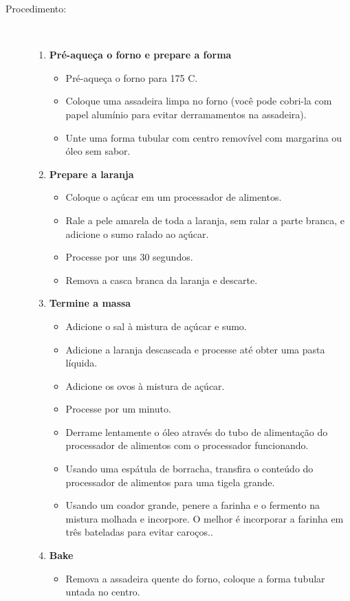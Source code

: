 \documentclass [11pt, letterpaper] {article}
\begin{document}
\begin {description}
\item [Procedimento:] \ \\
\begin {enumerate}
\item {\bf Pré-aqueça o forno e prepare a forma}
\begin {itemize}
\item Pré-aqueça o forno para 175 C.
\item Coloque uma assadeira limpa no forno (você pode cobri-la com papel alumínio para evitar derramamentos na assadeira).
\item Unte uma forma tubular com centro removível com margarina ou
\'oleo sem sabor.
\end {itemize}
\item {\bf Prepare a laranja}
\begin {itemize}
\item Coloque o açúcar em um processador de alimentos.
\item Rale a pele amarela de toda  a laranja, sem ralar a parte
branca, e adicione o sumo ralado ao açúcar.
\item Processe por uns 30 segundos.
\item Remova a casca branca da laranja e descarte.
\end {itemize}
\item {\bf Termine a massa}
\begin {itemize}
\item Adicione o sal à mistura de açúcar e sumo.
\item Adicione a laranja descascada e processe at\'e obter uma pasta l\'iquida.
\item Adicione os ovos à mistura de açúcar.
\item Processe por um minuto.
\item Derrame lentamente o óleo através do tubo de alimentação do processador de alimentos com o processador funcionando.
\item Usando uma espátula de borracha, transfira o conteúdo do processador de alimentos para uma tigela grande.
\item Usando um coador grande, penere a farinha e o fermento na
mistura molhada e incorpore. O melhor é incorporar a farinha em três bateladas para evitar caro\c{c}os..
\end {itemize}
\item {\bf Bake}
\begin {itemize}
\item Remova a assadeira quente do forno, coloque a forma tubular untada no centro.

\end{itemize}
\end{enumerate}
\end{description}
\end{document}
